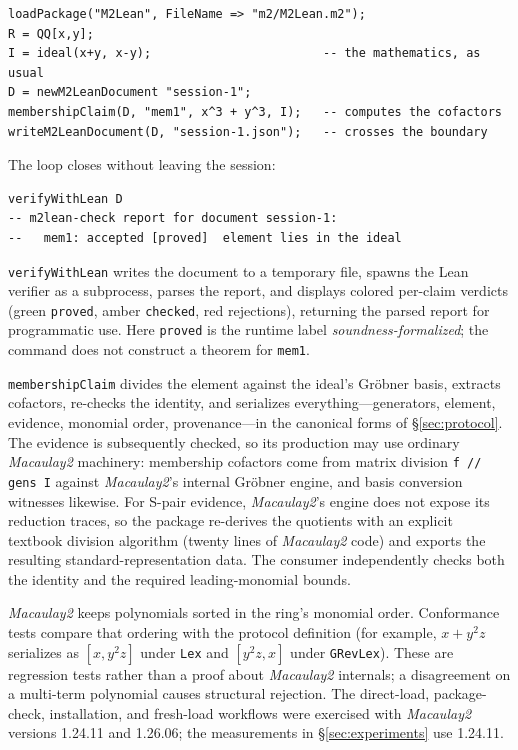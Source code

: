 \documentclass[11pt]{article}
\newcommand{\M}{\textit{Macaulay2}}
\newcommand{\code}[1]{\texttt{#1}}
\begin{document}
\noindent\begin{minipage}{\linewidth}
\begin{lstlisting}[style=m2style]
loadPackage("M2Lean", FileName => "m2/M2Lean.m2");
R = QQ[x,y];
I = ideal(x+y, x-y);                        -- the mathematics, as usual
D = newM2LeanDocument "session-1";
membershipClaim(D, "mem1", x^3 + y^3, I);   -- computes the cofactors
writeM2LeanDocument(D, "session-1.json");   -- crosses the boundary
\end{lstlisting}
\end{minipage}

\noindent
The loop closes without leaving the session:

\begin{lstlisting}[style=m2style]
verifyWithLean D
-- m2lean-check report for document session-1:
--   mem1: accepted [proved]  element lies in the ideal
\end{lstlisting}

\noindent
\code{verifyWithLean} writes the document to a temporary file, spawns
the Lean verifier as a subprocess, parses the report, and displays
colored per-claim verdicts (green \code{proved}, amber \code{checked},
red rejections), returning the parsed report for programmatic use.
Here \code{proved} is the runtime label \emph{soundness-formalized}; the
command does not construct a theorem for \code{mem1}.

\code{membershipClaim} divides
the element against the ideal's Gr\"obner basis, extracts cofactors,
re-checks the identity, and serializes everything---generators,
element, evidence, monomial order, provenance---in the canonical
forms of \S\ref{sec:protocol}.  The evidence is subsequently checked,
so its production may use ordinary \M{} machinery:
membership cofactors come from matrix division \code{f // gens I}
against \M{}'s internal Gr\"obner engine, and basis conversion
witnesses likewise.  For S-pair evidence, \M{}'s engine
does not expose its reduction traces, so the package re-derives the
quotients with an explicit textbook division algorithm (twenty lines
of \M{} code) and exports the resulting standard-representation data.
The consumer independently checks both the identity and the required
leading-monomial bounds.

\M{} keeps polynomials sorted in the ring's monomial order.  Conformance
tests compare that ordering with the protocol definition (for example,
$x+y^2z$ serializes as $[x,y^2z]$ under \code{Lex} and
$[y^2z,x]$ under \code{GRevLex}).  These are regression tests rather
than a proof about \M{} internals; a disagreement on a multi-term
polynomial causes structural rejection.
The direct-load, package-check, installation, and fresh-load workflows were
exercised with \M{} versions 1.24.11 and 1.26.06; the measurements in
\S\ref{sec:experiments} use 1.24.11.
\end{document}
